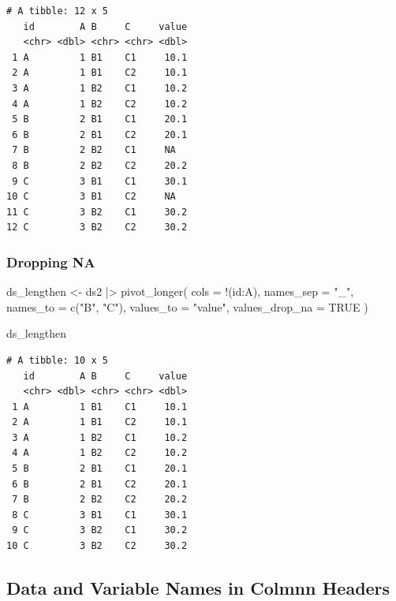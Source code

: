 \documentclass[
  letterpaper,
  DIV=11,
  numbers=noendperiod]{scrreprt}
\newenvironment{Shaded}{\begin{snugshade}}{\end{snugshade}}
\newcommand{\AttributeTok}[1]{\textcolor[rgb]{0.40,0.45,0.13}{#1}}
\newcommand{\ConstantTok}[1]{\textcolor[rgb]{0.56,0.35,0.01}{#1}}
\newcommand{\FunctionTok}[1]{\textcolor[rgb]{0.28,0.35,0.67}{#1}}
\newcommand{\NormalTok}[1]{\textcolor[rgb]{0.00,0.23,0.31}{#1}}
\newcommand{\OtherTok}[1]{\textcolor[rgb]{0.00,0.23,0.31}{#1}}
\newcommand{\SpecialCharTok}[1]{\textcolor[rgb]{0.37,0.37,0.37}{#1}}
\newcommand{\StringTok}[1]{\textcolor[rgb]{0.13,0.47,0.30}{#1}}
\begin{document}
\begin{verbatim}
# A tibble: 12 x 5
   id        A B     C     value
   <chr> <dbl> <chr> <chr> <dbl>
 1 A         1 B1    C1     10.1
 2 A         1 B1    C2     10.1
 3 A         1 B2    C1     10.2
 4 A         1 B2    C2     10.2
 5 B         2 B1    C1     20.1
 6 B         2 B1    C2     20.1
 7 B         2 B2    C1     NA  
 8 B         2 B2    C2     20.2
 9 C         3 B1    C1     30.1
10 C         3 B1    C2     NA  
11 C         3 B2    C1     30.2
12 C         3 B2    C2     30.2
\end{verbatim}

\subsubsection{Dropping NA}\label{dropping-na}

\begin{Shaded}
\begin{Highlighting}[]
\NormalTok{ds\_lengthen }\OtherTok{\textless{}{-}}\NormalTok{ ds2 }\SpecialCharTok{|\textgreater{}} 
  \FunctionTok{pivot\_longer}\NormalTok{(}
    \AttributeTok{cols =} \SpecialCharTok{!}\NormalTok{(id}\SpecialCharTok{:}\NormalTok{A),}
    \AttributeTok{names\_sep =} \StringTok{"\_"}\NormalTok{,}
    \AttributeTok{names\_to =} \FunctionTok{c}\NormalTok{(}\StringTok{"B"}\NormalTok{, }\StringTok{"C"}\NormalTok{),}
    \AttributeTok{values\_to =} \StringTok{"value"}\NormalTok{,}
    \AttributeTok{values\_drop\_na =} \ConstantTok{TRUE}
\NormalTok{  )}

\NormalTok{ds\_lengthen}
\end{Highlighting}
\end{Shaded}

\begin{verbatim}
# A tibble: 10 x 5
   id        A B     C     value
   <chr> <dbl> <chr> <chr> <dbl>
 1 A         1 B1    C1     10.1
 2 A         1 B1    C2     10.1
 3 A         1 B2    C1     10.2
 4 A         1 B2    C2     10.2
 5 B         2 B1    C1     20.1
 6 B         2 B1    C2     20.1
 7 B         2 B2    C2     20.2
 8 C         3 B1    C1     30.1
 9 C         3 B2    C1     30.2
10 C         3 B2    C2     30.2
\end{verbatim}

\subsection{Data and Variable Names in Colmnn
Headers}\label{data-and-variable-names-in-colmnn-headers}
\end{document}
